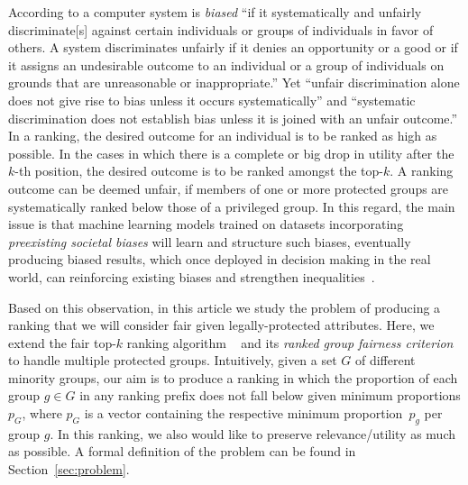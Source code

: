 According to \citet{friedman1996bias} a computer system is \emph{biased} ``if it systematically and unfairly discriminate[s] against certain individuals or groups of individuals in favor of others.
%
A system discriminates unfairly if it denies an opportunity or a good or if it assigns an undesirable outcome to an individual or a group of individuals on grounds that are unreasonable or inappropriate.''
%
Yet ``unfair discrimination alone does not give rise to bias unless it occurs systematically'' and ``systematic discrimination does not establish bias unless it is joined with an unfair outcome.''
%
In a ranking, the desired outcome for an individual is to be ranked as high as possible. In the cases in which there is a complete or big drop in utility after the $k$-th position, the desired outcome is to be ranked amongst the top-$k$. A ranking outcome can be deemed unfair, if members of one or more protected groups are systematically ranked below those of a privileged group.
%
%
In this regard, the main issue is that machine learning models trained on datasets incorporating \textit{preexisting societal biases} will learn and structure such biases, eventually producing biased results, which once deployed in decision making in the real world, can reinforcing existing biases and strengthen inequalities~\cite{oneil2016weapons}.
%

Based on this observation, in this article we study the problem of producing a ranking that we will consider fair given legally-protected attributes.
%
Here, we extend the fair top-$k$ ranking algorithm \algoFAIR ~\cite{zehlike2017fair} and its \emph{ranked group fairness criterion} to handle multiple protected groups.
%
Intuitively, given a set $G$ of different minority groups, our aim is to produce a ranking in which the proportion of each group $g \in G$ in any ranking prefix does not fall below given minimum proportions $p_G$, where $p_G$ is a vector containing the respective minimum proportion~$p_g$ per group $g$.
%
In this ranking, we also would like to preserve relevance/utility as much as possible.
%
A formal definition of the problem can be found in Section~\ref{sec:problem}.

